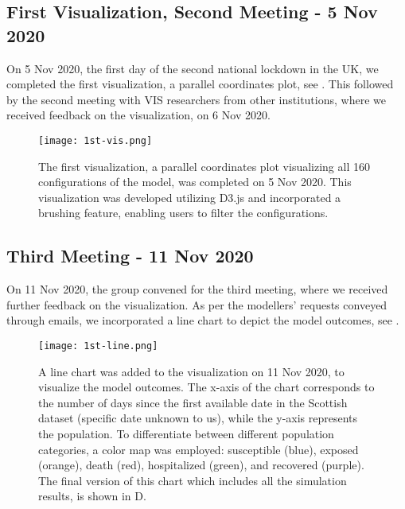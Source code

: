 \subsection{First Visualization, Second Meeting - 5 Nov 2020}
On 5 Nov 2020, the first day of the second national lockdown in the UK, we completed the first visualization, a parallel coordinates plot, see .
This followed by the second meeting with VIS researchers from other institutions, where we received feedback on the visualization, on 6 Nov 2020.
\begin{figure}
    \centering
    \texttt{[image: 1st-vis.png]}
    \caption{The first visualization, a parallel coordinates plot visualizing all 160 configurations of the model, was completed on 5 Nov 2020. This visualization was developed utilizing D3.js and incorporated a brushing feature, enabling users to filter the configurations.
    }
    \label{fig:1st-vis}

\end{figure}

\subsection{Third Meeting - 11 Nov 2020}
On 11 Nov 2020, the group convened for the third meeting, where we received further feedback on the visualization. As per the modellers' requests conveyed through emails, we incorporated a line chart to depict the model outcomes, see .

\begin{figure}
    \centering
    \texttt{[image: 1st-line.png]}
    \caption{A line chart was added to the visualization on 11 Nov 2020, to visualize the model outcomes.
    The x-axis of the chart corresponds to the number of days since the first available date in the Scottish dataset (specific date unknown to us), while the y-axis represents the population.
    To differentiate between different population categories, a color map was employed: susceptible (blue), exposed (orange), death (red), hospitalized (green), and recovered (purple).
    The final version of this chart which includes all the simulation results, is shown in D.
    }
    \label{fig:1st-line}

\end{figure}

